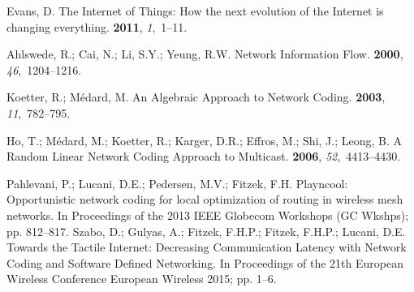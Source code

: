 \documentclass[electronics,article,accept,moreauthors,pdftex,10pt,a4paper]{mdpi}
\theoremstyle{mdpi}
\newcounter{ex}
\newcounter{re}
\theoremstyle{mdpidefinition}
\begin{document}



 \renewcommand\bibname{References}
 \begin{thebibliography}{999}
\providecommand{\natexlab}[1]{#1}

Evans, D.
\newblock The Internet of Things: How the next evolution of the Internet is
  changing everything.
 {\bf 2011}, {\em 1},~1--11.

Ahlswede, R.; Cai, N.; Li, S.Y.; Yeung, R.W.
\newblock Network Information Flow.
 {\bf 2000}, {\em
  46},~1204--1216.

Koetter, R.; M\'edard, M.
\newblock An Algebraic Approach to Network Coding.
 {\bf 2003}, {\em 11},~782--795.

Ho, T.; M{\'e}dard, M.; Koetter, R.; Karger, D.R.; Effros, M.; Shi, J.; Leong,
  B.
\newblock A Random Linear Network Coding Approach to Multicast.
 {\bf 2006}, {\em
  52},~4413--4430.

Pahlevani, P.; Lucani, D.E.; Pedersen, M.V.; Fitzek, F.H.
\newblock Playncool: Opportunistic network coding for local optimization of
  routing in wireless mesh networks.
\newblock In Proceedings of the 2013 IEEE Globecom Workshops (GC Wkshps); pp.
  812--817.
Szabo, D.; Gulyas, A.; Fitzek, F.H.P.; Fitzek, F.H.P.; Lucani, D.E.
\newblock Towards the Tactile Internet: Decreasing Communication Latency with
  Network Coding and Software Defined Networking.
\newblock  In Proceedings of the 21th European Wireless Conference European Wireless 2015; pp. 1--6.


\end{thebibliography}
\end{document}
